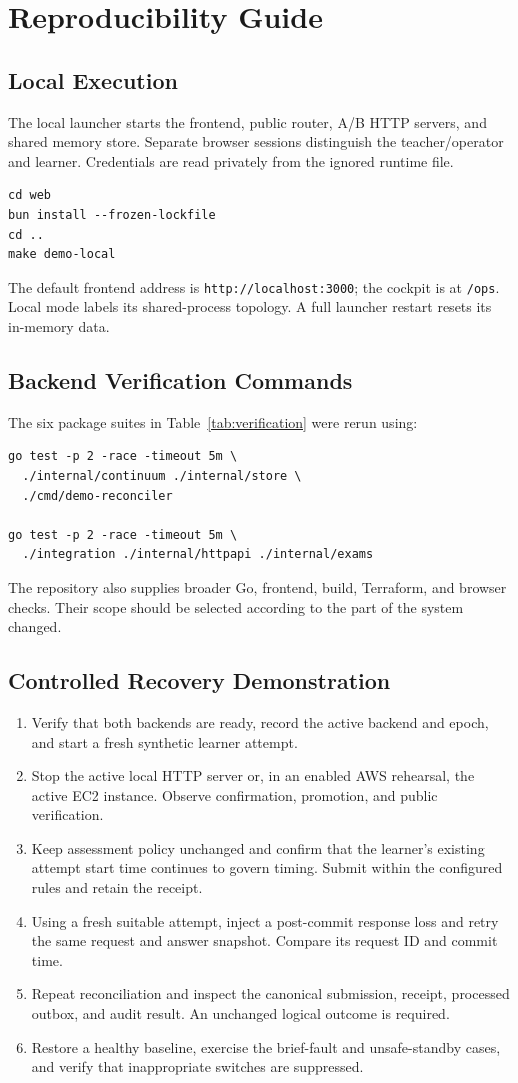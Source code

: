 \chapter{Reproducibility Guide}
\section{Local Execution}
The local launcher starts the frontend, public router, A/B HTTP servers, and shared memory store. Separate browser sessions distinguish the teacher/operator and learner. Credentials are read privately from the ignored runtime file.
\begin{lstlisting}
cd web
bun install --frozen-lockfile
cd ..
make demo-local
\end{lstlisting}
The default frontend address is \texttt{http://localhost:3000}; the cockpit is at \texttt{/ops}. Local mode labels its shared-process topology. A full launcher restart resets its in-memory data.
\section{Backend Verification Commands}
The six package suites in Table~\ref{tab:verification} were rerun using:
\begin{lstlisting}
go test -p 2 -race -timeout 5m \
  ./internal/continuum ./internal/store \
  ./cmd/demo-reconciler

go test -p 2 -race -timeout 5m \
  ./integration ./internal/httpapi ./internal/exams
\end{lstlisting}
The repository also supplies broader Go, frontend, build, Terraform, and browser checks. Their scope should be selected according to the part of the system changed.
\section{Controlled Recovery Demonstration}
\begin{enumerate}
\item Verify that both backends are ready, record the active backend and epoch, and start a fresh synthetic learner attempt.
\item Stop the active local HTTP server or, in an enabled AWS rehearsal, the active EC2 instance. Observe confirmation, promotion, and public verification.
\item Keep assessment policy unchanged and confirm that the learner's existing attempt start time continues to govern timing. Submit within the configured rules and retain the receipt.
\item Using a fresh suitable attempt, inject a post-commit response loss and retry the same request and answer snapshot. Compare its request ID and commit time.
\item Repeat reconciliation and inspect the canonical submission, receipt, processed outbox, and audit result. An unchanged logical outcome is required.
\item Restore a healthy baseline, exercise the brief-fault and unsafe-standby cases, and verify that inappropriate switches are suppressed.
\end{enumerate}
